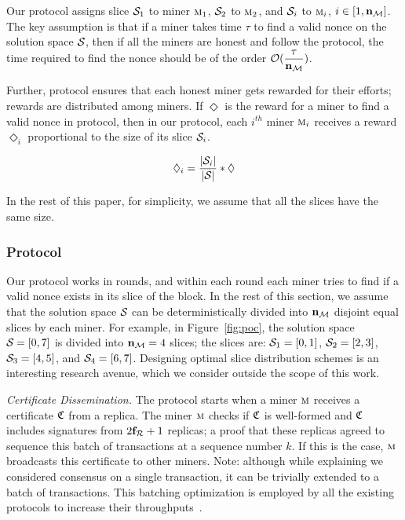 Our \PoC{} protocol assigns slice $\mathcal{S}_{1}$ to miner $\textsc{m}_{1}$, $\mathcal{S}_{2}$ 
to $\textsc{m}_{2}$, and $\mathcal{S}_{i}$ to $\textsc{m}_{i}$, $i \in [1,\mathbf{n}_{\mathcal{M}}]$. The key 
assumption is that if a miner takes time $\tau$ to find a valid nonce on the solution 
space $\mathcal{S}_{}$, then if all the miners are honest and follow the \PoC{} protocol, 
the time required to find the nonce should be of the order 
$\mathcal{O}(\dfrac{\tau}{\mathbf{n}_{\mathcal{M}{}}})$.

Further, \PoC{} protocol ensures that each honest miner gets rewarded for their 
efforts; rewards are distributed among miners. If $\Diamond$ is the reward for a 
miner to find a valid nonce in \PoW{} protocol, then in our \PoC{} protocol, each 
$i^{th}$ miner $\textsc{m}_{i}$ receives a reward $\Diamond_i$ proportional to the size 
of its slice $\mathcal{S}_{i}$.%

\begin{equation} 
    \Diamond_i = \frac{\lvert \mathcal{S}_{i} \rvert}{\lvert \mathcal{S}_{} \rvert} * \Diamond
\end{equation}

In the rest of this paper, for simplicity, we assume that all the slices have the same size.

\subsubsection{\PoC{} Protocol}
Our \PoC{} protocol works in rounds, and within each round each miner tries to find 
if a valid nonce exists in its slice of the block. In the rest of this section, we 
assume that the solution space $\mathcal{S}_{}$ can be deterministically divided into 
$\mathbf{n}_{\mathcal{M}{}}$ disjoint equal slices by each miner. For example, in Figure~\ref{fig:poc}, 
the solution space $\mathcal{S}_{} = [0,7]$ is divided into $\mathbf{n}_{\mathcal{M}{}} = 4$ slices; the 
slices are: $\mathcal{S}_{1} = [0,1]$, $\mathcal{S}_{2} = [2,3]$, $\mathcal{S}_{3} = [4,5]$, and $\mathcal{S}_{4} = [6,7]$.
Designing optimal slice distribution schemes is an interesting research avenue, which 
we consider outside the scope of this work.

{\em Certificate Dissemination.} 
The \PoC{} protocol starts when a miner $\textsc{m}{}$ receives a certificate $\mathfrak{C}$ 
from a replica. The miner $\textsc{m}{}$ checks if $\mathfrak{C}$ is well-formed and 
$\mathfrak{C}$ includes signatures from $2\mathbf{f}_{\mathcal{R}{}}+1$ replicas; a proof that 
these replicas agreed to sequence this batch of transactions at a sequence number $k$.
If this is the case, $\textsc{m}{}$ broadcasts this certificate to other miners.
Note: although while explaining \pbft{} we considered consensus on a single transaction, 
it can be trivially extended to a batch of transactions. This batching optimization is 
employed by all the existing \BFT{} protocols to increase their 
throughputs~\cite{pbftj,poe,rcc}.


